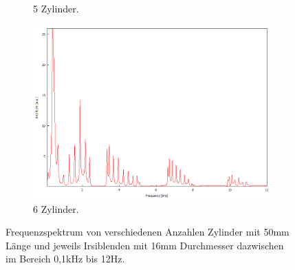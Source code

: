 \begin{figure}
\begin{subfigure}[b]{0.3\textwidth}
        \caption{5 Zylinder.}
    \end{subfigure}
    \hfill
    \begin{subfigure}[b]{0.3\textwidth}
        \centering
        \includegraphics[width=\textwidth]{data/4_1/9.png}
        \caption{6 Zylinder.}
    \end{subfigure}
    \hfill
    \caption{Frequenzspektrum von verschiedenen Anzahlen Zylinder mit 50\;mm Länge und jeweils Irsiblenden mit 16\;mm Durchmesser dazwischen im Bereich 0,1\;kHz bis 12\;Hz.}
    \label{fig:anhang_allesgleich}
\end{figure}